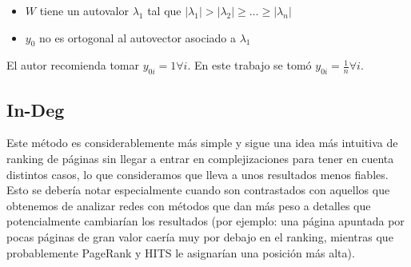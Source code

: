 \documentclass[a4paper]{article}
\begin{document}
\begin{itemize}
\item $W$ tiene un autovalor $\lambda_1$ tal que $|\lambda_1| > |\lambda_2| \geq \dots \geq |\lambda_n|$ 
\item $y_0$ no es ortogonal al autovector asociado a $\lambda_1$
\end{itemize}

El autor recomienda tomar $y_{0i}=1 \forall i$. En este trabajo se tomó $y_{0i}=\frac{1}n \forall i$.






\subsection{In-Deg}

Este m\'etodo es considerablemente m\'{a}s simple y sigue una idea m\'{a}s intuitiva de ranking de p\'aginas sin llegar a entrar en complejizaciones para tener en cuenta distintos casos, lo que consideramos que lleva a unos resultados menos fiables. Esto se debería notar especialmente cuando son contrastados con aquellos que obtenemos de analizar redes con m\'etodos que dan m\'as peso a detalles que potencialmente cambiarían los resultados (por ejemplo: una página apuntada por pocas páginas de gran valor caería muy por debajo en el ranking, mientras que probablemente PageRank y HITS le asignarían una posición más alta).
\end{document}
